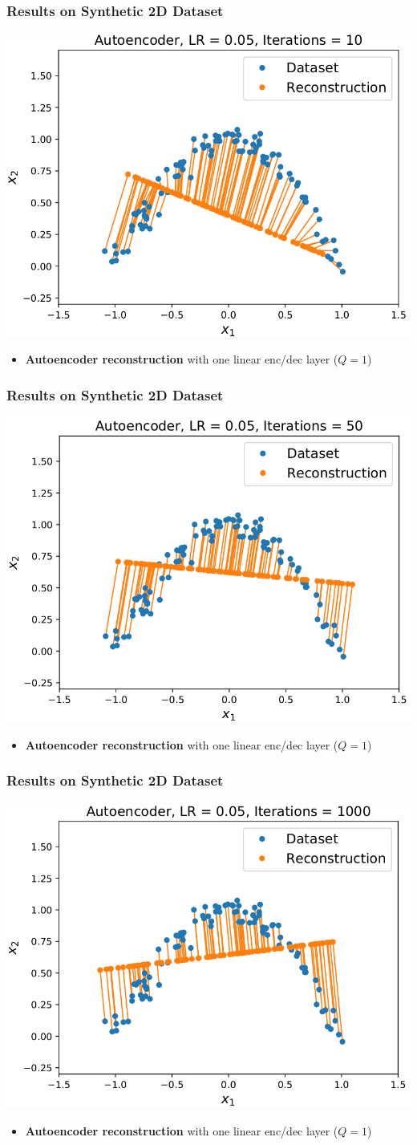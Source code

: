 \documentclass[10pt,aspectratio=169]{beamer}
\begin{document}
\begin{frame}
  \frametitle{Results on Synthetic 2D Dataset}
\begin{center}
\includegraphics[width=.5\textwidth]{images/s19}
\end{center}
\small{
\begin{itemize}
\item \textbf{Autoencoder reconstruction} with one linear enc/dec layer ($Q=1$)
\end{itemize}
}

\end{frame}
\begin{frame}
  \frametitle{Results on Synthetic 2D Dataset}
\begin{center}
\includegraphics[width=.5\textwidth]{images/s20}
\end{center}
\small{
\begin{itemize}
\item \textbf{Autoencoder reconstruction} with one linear enc/dec layer ($Q=1$)
\end{itemize}
}
\end{frame}

\begin{frame}
  \frametitle{Results on Synthetic 2D Dataset}
\begin{center}
\includegraphics[width=.5\textwidth]{images/s21}
\end{center}
\small{
\begin{itemize}
\item \textbf{Autoencoder reconstruction} with one linear enc/dec layer ($Q=1$)
\end{itemize}
}
\end{frame}
\end{document}
